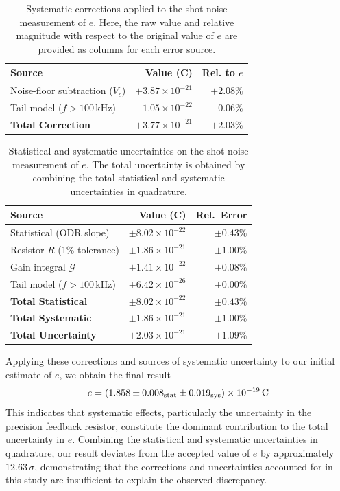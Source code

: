 \documentclass[aps,twocolumn,secnumarabic,balancelastpage,amsmath,amssymb,nofootinbib,floatfix]{revtex4-1}
\begin{document}
\begin{table}[h]
\centering
\begin{tabular}{|l|r|r|}
\toprule
\textbf{Source} & \textbf{Value (C)} & \textbf{Rel. to $e$} \\
\midrule
\quad Noise-floor subtraction ($V_c$) & $+3.87 \times 10^{-21}$ & $+2.08\%$ \\
\quad Tail model ($f > 100\,\mathrm{kHz}$) & $-1.05 \times 10^{-22}$ & $-0.06\%$ \\
\midrule
\textbf{Total Correction} & $+3.77 \times 10^{-21}$ & $+2.03\%$ \\
\bottomrule
\end{tabular}
\caption{Systematic corrections applied to the shot-noise measurement of $e$. Here, the raw value and relative magnitude with respect to the original value of $e$ are provided as columns for each error source.}
\label{tab:corrections}
\end{table}

\begin{table}[h]
\centering
\begin{tabular}{|l|r|r|}
\toprule
\textbf{Source} & \textbf{Value (C)} & \textbf{Rel.\ Error} \\
\midrule
\quad Statistical (ODR slope) & $\pm8.02 \times 10^{-22}$ & $\pm0.43\%$ \\
\quad Resistor $R$ (1\% tolerance) & $\pm1.86 \times 10^{-21}$ & $\pm1.00\%$ \\
\quad Gain integral $\mathcal{G}$ & $\pm1.41 \times 10^{-22}$ & $\pm0.08\%$ \\
\quad Tail model ($f > 100\,\mathrm{kHz}$) & $\pm6.42 \times 10^{-26}$ & $\pm0.00\%$ \\
\midrule
\textbf{Total Statistical} & $\pm8.02 \times 10^{-22}$ & $\pm0.43\%$ \\
\textbf{Total Systematic} & $\pm1.86 \times 10^{-21}$ & $\pm1.00\%$ \\
\textbf{Total Uncertainty} & $\pm2.03 \times 10^{-21}$ & $\pm1.09\%$ \\
\bottomrule
\end{tabular}
\caption{Statistical and systematic uncertainties on the shot-noise measurement of $e$. The total uncertainty is obtained by combining the total statistical and systematic uncertainties in quadrature.}
\label{tab:uncertainties}
\end{table}

Applying these corrections and sources of systematic uncertainty to our initial estimate of $e$, we obtain the final result
\begin{equation}
    e = \left( 1.858 \pm 0.008_{\rm stat} \pm 0.019_{\rm sys} \right) \times 10^{{-19}}\,\text{C}
\end{equation}
This indicates that systematic effects, particularly the uncertainty in the precision feedback resistor, constitute the dominant contribution to the total uncertainty in $e$. Combining the statistical and systematic uncertainties in quadrature, our result deviates from the accepted value of $e$ by approximately $12.63\,\sigma$, demonstrating that the corrections and uncertainties accounted for in this study are insufficient to explain the observed discrepancy.
\end{document}
